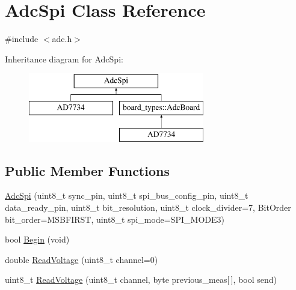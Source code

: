 \hypertarget{classAdcSpi}{}\section{Adc\+Spi Class Reference}
\label{classAdcSpi}


{\ttfamily \#include $<$adc.\+h$>$}

Inheritance diagram for Adc\+Spi\+:\begin{figure}[H]
\begin{center}
\leavevmode
\includegraphics[height=3.000000cm]{classAdcSpi}
\end{center}
\end{figure}
\subsection*{Public Member Functions}
\begin{DoxyCompactItemize}
\item 
\mbox{\hyperlink{classAdcSpi_a3c66ca397c2a9d0a7c475ee551b3c388}{Adc\+Spi}} (uint8\+\_\+t sync\+\_\+pin, uint8\+\_\+t spi\+\_\+bus\+\_\+config\+\_\+pin, uint8\+\_\+t data\+\_\+ready\+\_\+pin, uint8\+\_\+t bit\+\_\+resolution, uint8\+\_\+t clock\+\_\+divider=7, Bit\+Order bit\+\_\+order=M\+S\+B\+F\+I\+R\+ST, uint8\+\_\+t spi\+\_\+mode=S\+P\+I\+\_\+\+M\+O\+D\+E3)
\item 
bool \mbox{\hyperlink{classAdcSpi_aa8f8f27578dd85cfcdbc9439bbce66cb}{Begin}} (void)
\item 
double \mbox{\hyperlink{classAdcSpi_ace8264acfedb357986afa5f611eff3ee}{Read\+Voltage}} (uint8\+\_\+t channel=0)
\item 
uint8\+\_\+t \mbox{\hyperlink{classAdcSpi_ac9d2ab924ad4de5b91713a22189f2ad0}{Read\+Voltage}} (uint8\+\_\+t channel, byte previous\+\_\+meas\mbox{[}$\,$\mbox{]}, bool send)
\end{DoxyCompactItemize}
